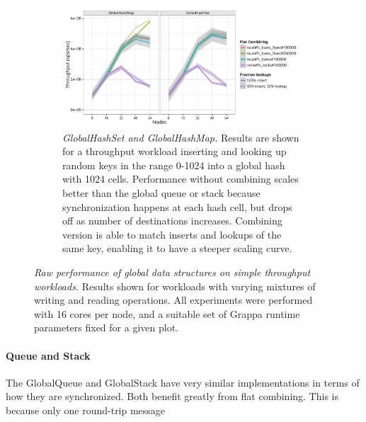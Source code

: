 \begin{figure}[t]
  \begin{subfigure}[b]{0.9\textwidth}
  \centering
  \includegraphics[width=\textwidth]{data/plots/hash_perf.pdf}
  \caption{\emph{GlobalHashSet and GlobalHashMap.} Results are shown for a throughput workload inserting and looking up random keys in the range 0-1024 into a global hash with 1024 cells.   Performance without combining scales better than the global queue or stack because synchronization happens at each hash cell, but drops off as number of destinations increases. Combining version is able to match inserts and lookups of the same key, enabling it to have a steeper scaling curve.}
  \label{fig:hash_perf}
  \end{subfigure}
  \caption{
    \emph{Raw performance of global data structures on simple throughput workloads.}
    Results shown for workloads with varying mixtures of writing and reading operations. All experiments were performed with 16 cores per node, and a suitable set of Grappa runtime parameters fixed for a given plot.
  }\label{fig:datastructs}
\end{figure}

\paragraph{Queue and Stack}
The GlobalQueue and GlobalStack have very similar implementations in terms of how they are synchronized. Both benefit greatly from flat combining. This is because only one round-trip message 

